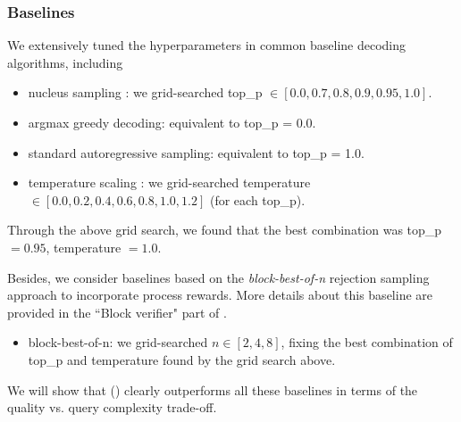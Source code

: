 \clearpage
\subsubsection{Baselines}
\label{sec:experiments:codellama:baselines}

We extensively tuned the hyperparameters in common baseline decoding algorithms, including
\begin{itemize}
    \item nucleus sampling \citep{holtzman2020the}: we grid-searched top\_p $\in [0.0, 0.7, 0.8, 0.9, 0.95, 1.0]$.
    \item argmax greedy decoding: equivalent to top\_p = 0.0.
    \item standard autoregressive sampling: equivalent to top\_p = 1.0.
    \item temperature scaling \citep{ackley1985learning}: we grid-searched temperature $\in [0.0, 0.2, 0.4, 0.6, 0.8, 1.0, 1.2]$ (for each top\_p).
\end{itemize}

Through the above grid search, 
we found that the best combination was top\_p $= 0.95$, temperature $= 1.0$.

Besides, we consider baselines based on the \emph{block-best-of-n} rejection sampling approach to incorporate process rewards.
More details about this baseline are provided in the ``Block verifier" part of .
\begin{itemize}
    \item block-best-of-n: we grid-searched $n \in [2, 4, 8]$, fixing the best combination of top\_p and temperature found by the grid search above.
\end{itemize}

We will show that \algoName ()
clearly outperforms all these baselines in terms of the quality vs. query complexity trade-off.







